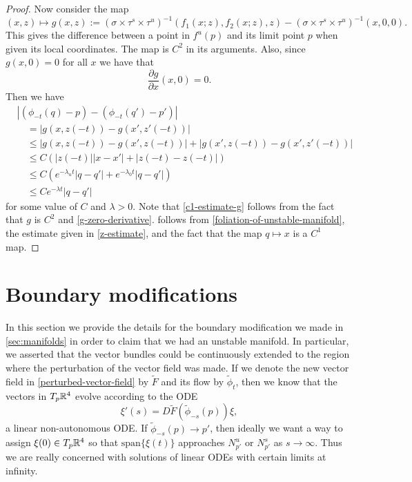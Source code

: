 \begin{proof}
	Now consider the map
	\begin{equation}
		(x,z) \mapsto g(x,z) := (\sigma \times \tau^s \times \tau^u)^{-1}(f_1(x;z) , f_2(x;z), z) - (\sigma \times \tau^s \times \tau^u)^{-1}(x,0,0).
	\end{equation}
	This gives the difference between a point in \(f^u(p)\) and its limit point \(p\) when given its local coordinates. The map is \(C^2\) in its arguments. Also, since \(g(x,0)= 0\) for all \(x\) we have that
	\begin{equation}\label{g-zero-derivative}
		\frac{\partial g}{\partial x}(x,0) = 0.
	\end{equation}
	Then we have 
	\begin{align}
		&|(\phi_{-t}(q) - p) - (\phi_{-t}(q') - p')| \nonumber \\
		&\quad= |g(x, z(-t)) - g(x',z'(-t))| \nonumber \\
		&\quad\leq |g(x, z(-t)) - g(x',z(-t)) | + |g(x',z(-t)) - g(x',z'(-t))| \nonumber \\
		&\quad\leq C(|z(-t)||x-x'| + |z(-t) -z(-t)|)  \label{c1-estimate-g}\\
		&\quad \leq C(e^{-\lambda_u t} |q-q'| + e^{-\lambda_0 t} |q-q'|) \label{exponential-estimate-g} \\
		&\quad \leq C e^{-\lambda t} |q-q'| \nonumber
	\end{align}
	for some value of \(C\) and \(\lambda>0\). Note that \cref{c1-estimate-g} follows from the fact that \(g\) is \(C^2\) and \cref{g-zero-derivative}.  follows from \cref{foliation-of-unstable-manifold}, the estimate given in \cref{z-estimate}, and the fact that the map \(q\mapsto x\) is a \(C^1\) map.
\end{proof}
\section{Boundary modifications}\label{sec:boundary-modifications}

In this section we provide the details for the boundary modification we made in \cref{sec:manifolds} in order to claim that we had an unstable manifold. In particular, we asserted that the vector bundles could be continuously extended to the region where the perturbation of the vector field was made. If we denote the new vector field in \cref{perturbed-vector-field} by \(\tilde F\) and its flow by \(\tilde \phi_t\), then we know that the vectors in \(T_p\mathbb{R}^4\) evolve according to the ODE
\begin{equation}\label{flow-tangent-vectors-perturbed}
	\xi'(s) = D\tilde F(\tilde \phi_{-s}(p)) \xi,
\end{equation}
a linear non-autonomous ODE. If \(\tilde \phi_{-s}(p) \to p'\), then ideally we want a way to assign \(\xi(0) \in T_p\mathbb{R}^4\) so that \(\mathrm{span}\{\xi(t)\}\) approaches \(N^u_{p'}\) or \(N^s_{p'}\) as \(s\to \infty\). Thus we are really concerned with solutions of linear ODEs with certain limits at infinity.

